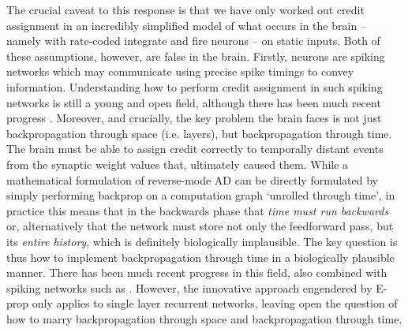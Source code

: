The crucial caveat to this response is that we have only worked out credit assignment in an incredibly simplified model of what occurs in the brain -- namely with rate-coded integrate and fire neurons -- on static inputs. Both of these assumptions, however, are false in the brain. Firstly, neurons are spiking networks which may communicate using precise spike timings to convey information. Understanding how to perform credit assignment in such spiking networks is still a young and open field, although there has been much recent progress \citep{schiess2016somato,zenke2018superspike,kaiser2020synaptic,neftci2019surrogate}. Moreover, and crucially, the key problem the brain faces is not just backpropagation through space (i.e. layers), but backpropagation through time. The brain must be able to assign credit correctly to temporally distant events from the synaptic weight values that, ultimately caused them. While a mathematical formulation of reverse-mode AD can be directly formulated by simply performing backprop on a computation graph `unrolled through time', in practice this means that in the backwards phase that \emph{time must run backwards} or, alternatively that the network must store not only the feedforward pass, but its \emph{entire history}, which is definitely biologically implausible. The key question is thus how to implement backpropagation through time in a biologically plausible manner. There has been much recent progress in this field, also combined with spiking networks such as \citep{zenke2018superspike,bellec2020solution}. However, the innovative approach engendered by E-prop only applies to single layer recurrent networks, leaving open the question of how to marry backpropagation through space and backpropagation through time.

